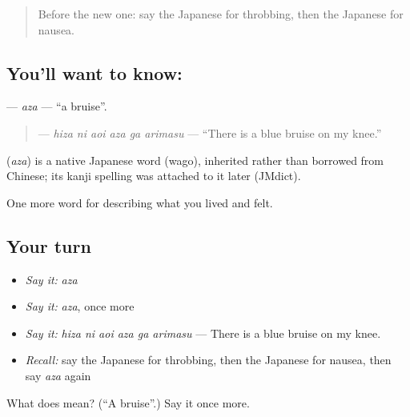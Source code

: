 \label{lesson:JA-C445-aza}



\begin{quote}
Before the new one: say the Japanese for throbbing, then the Japanese for nausea.
\end{quote}

\subsection*{You'll want to know: }
\textbf{} — \emph{aza} — \textquotedblleft{}a bruise\textquotedblright{}.

\begin{quote}
\textbf{   } — \emph{hiza ni aoi aza ga arimasu} — \textquotedblleft{}There is a blue bruise on my knee.\textquotedblright{}
\end{quote}

\begin{cousinweb}
\textbf{} (\emph{aza}) is a native Japanese word (wago), inherited rather than borrowed from Chinese; its kanji spelling was attached to it later (JMdict).
\end{cousinweb}

\begin{grammarlens}[title={What you've built}]
One more word for describing what you lived and felt.
\end{grammarlens}

\subsection*{Your turn}
\begin{itemize}
\raggedright
  \item \emph{Say it:} \emph{aza}
  \item \emph{Say it:} \emph{aza}, once more
  \item \emph{Say it:} \emph{hiza ni aoi aza ga arimasu} — There is a blue bruise on my knee.
  \item \emph{Recall:} say the Japanese for throbbing, then the Japanese for nausea, then say \emph{aza} again
\end{itemize}

\begin{tcolorbox}[breakable,colback=teal!4,colframe=teal!35!black,title={Before you move on}]
What does  mean? (\textquotedblleft{}A bruise\textquotedblright{}.) Say it once more.
\end{tcolorbox}

